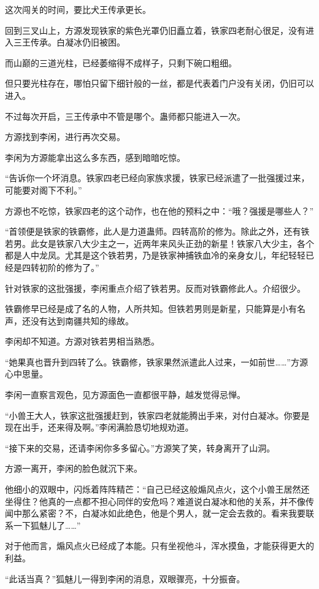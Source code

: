 \begin{this_body}
这次闯关的时间，要比犬王传承更长。

回到三叉山上，方源发现铁家的紫色光罩仍旧矗立着，铁家四老耐心很足，没有进入三王传承。白凝冰仍旧被困。

而山巅的三道光柱，已经萎缩得不成样子，只剩下碗口粗细。

但只要光柱存在，哪怕只留下细针般的一丝，都是代表着门户没有关闭，仍旧可以进入。

不过每次开启，三王传承中不管是哪个。蛊师都只能进入一次。

方源找到李闲，进行再次交易。

李闲为方源能拿出这么多东西，感到暗暗吃惊。

“告诉你一个坏消息。铁家四老已经向家族求援，铁家已经派遣了一批强援过来，可能要对阁下不利。”

方源也不吃惊，铁家四老的这个动作，也在他的预料之中：“哦？强援是哪些人？”

“首领便是铁家的铁霸修，此人是力道蛊师。四转高阶的修为。除此之外，还有铁若男。此女是铁家八大少主之一，近两年来风头正劲的新星！铁家八大少主，各个都是人中龙凤。尤其是这个铁若男，乃是铁家神捕铁血冷的亲身女儿，年纪轻轻已经是四转初阶的修为了。”

针对铁家的这批强援，李闲重点介绍了铁若男。反而对铁霸修此人。介绍很少。

铁霸修早已经是成了名的人物，人所共知。但铁若男则是新星，只能算是小有名声，还没有达到南疆共知的缘故。

李闲却不知道。方源对铁若男相当熟悉。

“她果真也晋升到四转了么。铁霸修，铁家果然派遣此人过来，一如前世……”方源心中思量。

李闲一直察言观色，见方源面色一直都很平静，越发觉得忌惮。

“小兽王大人，铁家这批强援赶到，铁家四老就能腾出手来，对付白凝冰。你要是现在出手，还来得及啊。”李闲满脸恳切地规劝道。

“接下来的交易，还请李闲你多多留心。”方源笑了笑，转身离开了山洞。

方源一离开，李闲的脸色就沉下来。

他细小的双眼中，闪烁着阵阵精芒：“自己已经这般煽风点火，这个小兽王居然还坐得住？他真的一点都不担心同伴的安危吗？难道说白凝冰和他的关系，并不像传闻中那么紧密？不，白凝冰如此绝色，他是个男人，就一定会去救的。看来我要联系一下狐魅儿了……”

对于他而言，煽风点火已经成了本能。只有坐视他斗，浑水摸鱼，才能获得更大的利益。

“此话当真？”狐魅儿一得到李闲的消息，双眼骤亮，十分振奋。


\end{this_body}
